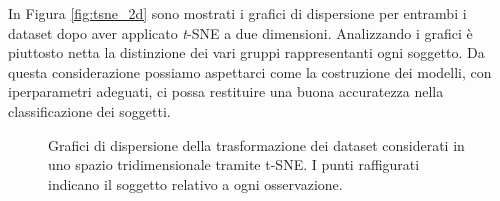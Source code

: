 \documentclass[12pt,italian]{report}
\begin{document}
In Figura \ref{fig:tsne_2d} sono mostrati i grafici di dispersione per entrambi i dataset dopo aver applicato \emph{t}-SNE a due dimensioni. Analizzando i grafici è piuttosto netta la distinzione dei vari gruppi rappresentanti ogni soggetto. Da questa considerazione possiamo aspettarci come la costruzione dei modelli, con  iperparametri adeguati, ci possa restituire una buona accuratezza nella classificazione dei soggetti.

\begin{figure}
	\centering
	\caption{Grafici di dispersione della trasformazione dei dataset considerati in uno spazio tridimensionale tramite t-SNE. I punti raffigurati indicano il soggetto relativo a ogni osservazione.}
	\label{fig:tsne_3d}
\end{figure}
\end{document}
